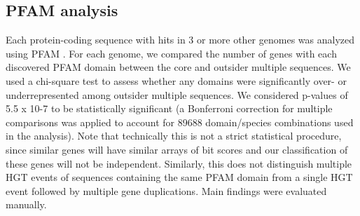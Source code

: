 \subsection{PFAM analysis} Each protein-coding sequence with hits in 3 or more
other genomes was analyzed using PFAM \cite{Finn2014}. For each genome, we compared the
number of genes with each discovered PFAM domain between the core and outsider
multiple sequences. We used a chi-square test to assess whether any domains
were significantly over- or underrepresented among outsider multiple sequences.
We considered p-values of 5.5 x 10-7 to be statistically significant (a
Bonferroni correction for multiple comparisons was applied to account for 89688
domain/species combinations used in the analysis). Note that technically this
is not a strict statistical procedure, since similar genes will have similar
arrays of bit scores and our classification of these genes will not be
independent. Similarly, this does not distinguish multiple HGT events of
sequences containing the same PFAM domain from a single HGT event followed by
multiple gene duplications. Main findings were evaluated manually.
